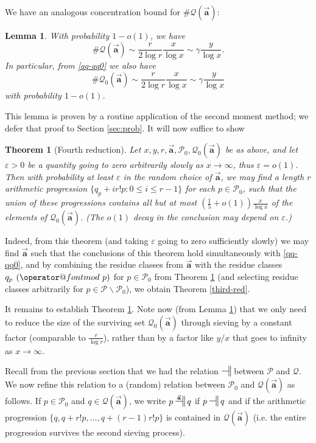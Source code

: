\documentclass[12pt]{amsart}
\makeatletter
\numberwithin{equation}{section}  %
\theoremstyle{remark}
\theoremstyle{plain}
\newtheorem{lem}{Lemma}[section]
\newtheorem{thm}{Theorem}
\numberwithin{equation}{section}
\renewcommand{\pmod}[1]{\allowbreak\mkern7mu({\operator@font mod}\,\,#1)}
\newcommand{\eps}{\ensuremath{\varepsilon}}
\renewcommand{\leq}{\leqslant}
\renewcommand{\(}{\left(}
\renewcommand{\)}{\right)}
\newcommand{\asym}{\sim}   %
\newcommand{\relr}{\nsdtstile{}{}} %
\newcommand{\relra}{\nsdtstile{}{\vect{\mathbf{a}}}} %
\newcommand{\vect}[1]{{\ensuremath{\vec{#1}}}}
\newcommand{\PP}{\mathcal{P}}
\newcommand{\QQ}{\mathcal{Q}}
\makeatother
\begin{document}
We have an analogous concentration bound for $\# \QQ(\vect{\mathbf{a}})$:

\begin{lem}\label{QQ1_normal}  With probability $1-o(1)$, we have
$$ \# \QQ(\vect{\mathbf{a}}) \asym \frac{r}{2\log r} \frac{x}{\log x} \asym \gamma \frac{y}{\log x}.$$
In particular, from \eqref{qq-qq0} we also have
$$ \# \QQ_0(\vect{\mathbf{a}}) \asym \frac{r}{2\log r} \frac{x}{\log x} \asym \gamma \frac{y}{\log x}$$
with probability $1-o(1)$.
\end{lem}

This lemma is proven by a routine application of the second moment method; we defer that proof to Section \ref{sec:prob}.  It will now suffice to show

\begin{thm}[Fourth reduction]\label{fourth-red}  Let
  $x,y,r,\vect{\mathbf{a}},\PP_0,\QQ_0(\vect{\mathbf{a}})$ be as
  above, and let $\eps > 0$ be a quantity going to zero arbitrarily
  slowly as $x \to \infty$, thus $\eps = o(1)$.  Then with probability
  at least $\eps$ in the random choice of $\vect{\mathbf{a}}$, 
we may find a length $r$  arithmetic progression $\{ q_p + i r! p: 0
\leq i \leq r-1\}$ for each $p \in \PP_0$, such that the union of
these progressions contains all but at most $(\frac{1}{5} + o(1)) \frac{x}{\log x}$ of the elements of $\QQ_0(\vect{\mathbf{a}})$.  (The $o(1)$ decay in the conclusion may depend on $\eps$.)
\end{thm}

Indeed, from this theorem (and taking $\eps$ going to zero sufficiently slowly) we may find $\vect{\mathbf{a}}$ such that the conclusions of this theorem hold simultaneously with \eqref{qq-qq0}, and by combining the residue classes from $\vect{\mathbf{a}}$ with the residue classes $q_p \pmod{p}$ for $p \in \PP_0$ from Theorem \ref{fourth-red} (and selecting residue classes arbitrarily for $p \in \PP \backslash \PP_0$), we obtain Theorem \ref{third-red}.

It remains to establish Theorem \ref{fourth-red}.  Note now (from Lemma \ref{QQ1_normal}) that we only need to reduce the size of the surviving set $\QQ_0(\vect{\mathbf{a}})$ through sieving by a constant factor (comparable to $\frac{r}{\log r}$), rather than by a factor like $y/x$ that goes to infinity as $x \to \infty$.

Recall from the previous section that we had the relation $\relr$ between $\PP$ and $\QQ$.  We now refine this relation to a (random) relation between $\PP_0$ and $\QQ(\vect{\mathbf{a}})$ as follows.  If $p \in \PP_0$ and $q \in \QQ(\vect{\mathbf{a}})$, we write $p \relra q$ if $p \relr q$ and if the arithmetic progression $\{ q, q+r!p, \dots, q+(r-1)r!p \}$ is contained in $\QQ(\vect{\mathbf{a}})$ (i.e. the entire progression survives the second sieving process).  
\end{document}
